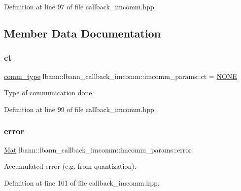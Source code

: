 Definition at line 97 of file callback\+\_\+imcomm.\+hpp.



\subsection{Member Data Documentation}
\mbox{\label{structlbann_1_1lbann__callback__imcomm_1_1imcomm__params_a11a805da5083e025171856111310d20d}} 
\subsubsection{\texorpdfstring{ct}{ct}}
{\footnotesize\ttfamily \hyperlink{classlbann_1_1lbann__callback__imcomm_acf7e894b3381e7f9b71020dc73594d6a}{comm\+\_\+type} lbann\+::lbann\+\_\+callback\+\_\+imcomm\+::imcomm\+\_\+params\+::ct = \hyperlink{classlbann_1_1lbann__callback__imcomm_acf7e894b3381e7f9b71020dc73594d6aafa59156bc4d5bcbf6bd80918d062da03}{N\+O\+NE}}

Type of communication done. 

Definition at line 99 of file callback\+\_\+imcomm.\+hpp.

\mbox{\label{structlbann_1_1lbann__callback__imcomm_1_1imcomm__params_ab62ef05ea8c9988e77e3a1943112c6b4}} 
\subsubsection{\texorpdfstring{error}{error}}
{\footnotesize\ttfamily \hyperlink{base_8hpp_a68f11fdc31b62516cb310831bbe54d73}{Mat} lbann\+::lbann\+\_\+callback\+\_\+imcomm\+::imcomm\+\_\+params\+::error}

Accumulated error (e.\+g. from quantization). 

Definition at line 101 of file callback\+\_\+imcomm.\+hpp.

